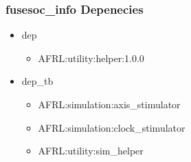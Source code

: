 \subsubsection{fusesoc\_info Depenecies}
\begin{itemize}
\item dep
	\begin{itemize}
	\item AFRL:utility:helper:1.0.0
	\end{itemize}
\item dep\_tb
	\begin{itemize}
	\item AFRL:simulation:axis\_stimulator
	\item AFRL:simulation:clock\_stimulator
	\item AFRL:utility:sim\_helper
	\end{itemize}
\end{itemize}
